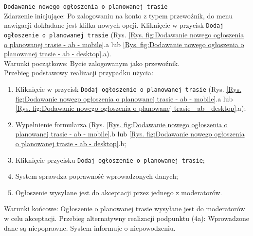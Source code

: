 \pagebreak
\texttt{Dodawanie nowego ogłoszenia o planowanej trasie} \\
Zdarzenie inicjujące: Po zalogowaniu na konto z typem przewoźnik, do menu nawigacji dokładane jest klilka nowych opcji. Kliknięcie w przycisk \texttt{Dodaj ogłoszenie o planowanej trasie} (Rys. \ref{Rys. fig:Dodawanie nowego ogłoszenia o planowanej trasie - ab - mobile}.a lub \ref{Rys. fig:Dodawanie nowego ogłoszenia o planowanej trasie - ab - desktop}.a). \\
Warunki początkowe: Bycie zalogowanym jako przewoźnik. \\
Przebieg podstawowy realizacji przypadku użycia:
\begin{enumerate}
    \item Kliknięcie w przycisk \texttt{Dodaj ogłoszenie o planowanej trasie} (Rys. \ref{Rys. fig:Dodawanie nowego ogłoszenia o planowanej trasie - ab - mobile}.a lub \ref{Rys. fig:Dodawanie nowego ogłoszenia o planowanej trasie - ab - desktop}.a);
    \item Wypełnienie formularza (Rys. \ref{Rys. fig:Dodawanie nowego ogłoszenia o planowanej trasie - ab - mobile}.b lub \ref{Rys. fig:Dodawanie nowego ogłoszenia o planowanej trasie - ab - desktop}.b;
    \item Kliknięcie przycisku \texttt{Dodaj ogłoszenie o planowanej trasie};
    \item System sprawdza poprawność wprowadzonych danych;
    \item Ogłoszenie wysyłane jest do akceptacji przez jednego z moderatorów.
\end{enumerate}
Warunki końcowe: Ogłoszenie o planowanej trasie wysyłane jest do moderatorów w celu akceptacji.
Przebieg alternatywny realizacji podpunktu (4a): Wprowadzone dane są niepoprawne. System informuje o niepowodzeniu. \\
